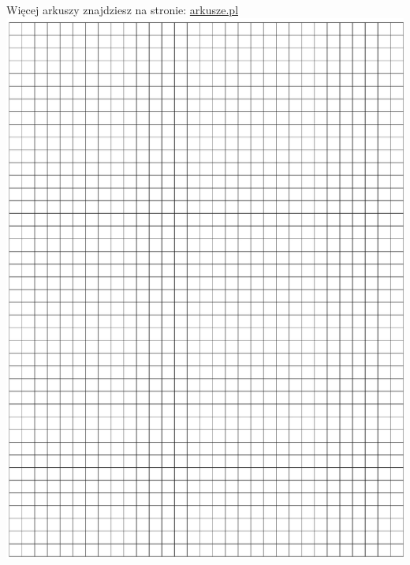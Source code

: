 \documentclass[10pt]{article}
\begin{document}
Więcej arkuszy znajdziesz na stronie: \href{http://arkusze.pl}{arkusze.pl}\\
\includegraphics[max width=\textwidth, center]{2024_11_21_5229b9d0453456f1828dg-16}\\
\end{document}
